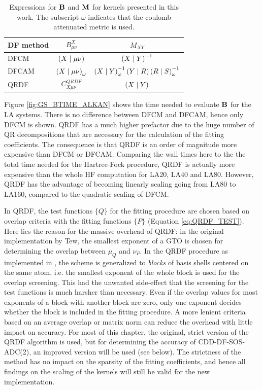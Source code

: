 \begin{table}
\centering
\begin{tabular}{lcc}
\hline
DF method & $B^X_{\mu\nu}$ & $M_{XY}$ \\
\hline
DFCM & $\left( X \mid \mu\nu \right)$ &  $\left( X \mid Y \right)^{-1}$ \\
DFCAM & $\left( X \mid \mu\nu \right)_{\omega}$ & $\left( X \mid Y \right)_{\omega}^{-1} \left( Y \mid R \right) \left( R \mid S \right)_{\omega}^{-1}$ \\
QRDF & $C^{QRDF}_{X\mu\nu}$ & $\left( X \mid Y \right)$ \\ 
\hline
\end{tabular}
\caption[Expressions for $\mbf{B}$ and $\mbf{M}$ for kernels presented in this work.]{Expressions for $\mbf{B}$ and $\mbf{M}$ for kernels presented in this work. The subscript $\omega$ indicates that the coulomb attenuated metric is used. \label{tab:BMTENSORS}}
\end{table}

Figure \ref{fig:GS_BTIME_ALKAN} shows the time needed to evaluate $\mbf{B}$ for the LA systems. There is no difference between DFCM and DFCAM, hence only DFCM is shown. QRDF has a much higher prefactor due to the huge number of QR decompositions that are necessary for the calculation of the fitting coefficients. The consequence is that QRDF is an order of magnitude more expensive than DFCM or DFCAM. Comparing the wall times here to the the total time needed for the Hartree-Fock procedure, QRDF is actually more expensive than the whole HF computation for LA20, LA40 and LA80. However, QRDF has the advantage of becoming linearly scaling going from LA80 to LA160, compared to the quadratic scaling of DFCM.  

In QRDF, the test functions $\{Q\}$ for the fitting procedure are chosen based on overlap criteria with the fitting functions $\{P\}$ (Equation \ref{eq:QRDF_TEST}). Here lies the reason for the massive overhead of QRDF: in the original implementation by Tew, the smallest exponent of a GTO is chosen for determining the overlap between $\mu_Q$ and $\nu_P$. In the QRDF procedure as implemented in \mchem{}, the scheme is generalized to \emph{blocks} of basis shells centered on the same atom, i.e. the smallest exponent of the whole block is used for the overlap screening. This had the unwanted side-effect that the screening for the test functions is much harsher than necessary. Even if the overlap values for most exponents of a block with another block are zero, only one exponent decides whether the block is included in the fitting procedure. A more lenient criteria based on an average overlap or matrix norm can reduce the overhead with little impact on accuracy. For most of this chapter, the original, strict version of the QRDF algorithm is used, but for determining the accuracy of CDD-DF-SOS-ADC(2), an improved version will be used (see below). The strictness of the method has no impact on the sparsity of the fitting coefficients, and hence all findings on the scaling of the kernels will still be valid for the new implementation.

